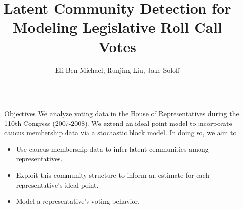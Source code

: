 \documentclass[final]{beamer}
\title{Latent Community Detection for Modeling Legislative Roll Call Votes} %
\author{Eli Ben-Michael, Runjing Liu, Jake Soloff } %
\institute{Department of Statistics, UC Berkeley} %
\newlength{\sepwid}
\newlength{\onecolwid}
\begin{document}

\setlength{\belowcaptionskip}{2ex} %
\setlength\belowdisplayshortskip{2ex} %

\begin{frame}[t] %



\begin{columns}[t] %

\begin{column}{\sepwid}\end{column} %

\begin{column}{\onecolwid} %




\begin{alertblock}{Objectives}
We analyze voting data in the House of Representatives during the 110th Congress (2007-2008). We extend an ideal point model to incorporate caucus membership data via a stochastic block model. In doing so, we aim to 
\begin{itemize}
\item Use caucus membership data to infer latent communities among representatives.
\item Exploit this community structure to inform an estimate for each representative's ideal point.
\item Model a representative's voting behavior.
\end{itemize}

\end{alertblock}



\end{column}
\end{columns}
\end{frame}
\end{document}

